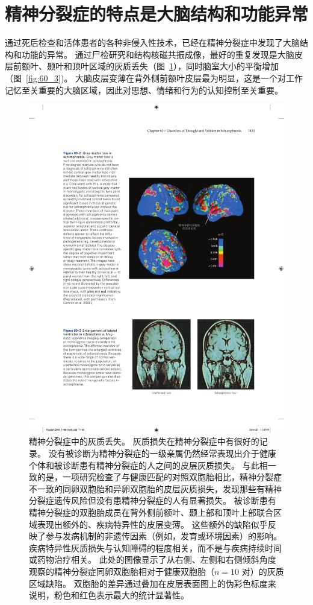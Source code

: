 \section{精神分裂症的特点是大脑结构和功能异常}

通过死后检查和活体患者的各种非侵入性技术，已经在精神分裂症中发现了大脑结构和功能的异常。
通过尸检研究和结构核磁共振成像，最好的重复发现是大脑皮层前额叶、颞叶和顶叶区域的灰质丢失（图~\ref{fig:60_2}），同时脑室大小的平衡增加（图~\ref{fig:60_3})。
大脑皮层变薄在背外侧前额叶皮层最为明显，这是一个对工作记忆至关重要的大脑区域，因此对思想、情绪和行为的认知控制至关重要。



\begin{figure}[htbp]
	\centering
	\includegraphics[width=0.83\linewidth]{chap60/fig_60_2}
	\caption{精神分裂症中的灰质丢失。
		灰质损失在精神分裂症中有很好的记录。
		没有被诊断为精神分裂症的一级亲属仍然经常表现出介于健康个体和被诊断患有精神分裂症的人之间的皮层灰质损失。
		与此相一致的是，一项研究检查了与健康匹配的对照双胞胎相比，精神分裂症不一致的同卵双胞胎和异卵双胞胎的皮层灰质损失，发现那些有精神分裂症遗传风险但没有患精神分裂症的人有显著损失。
		被诊断患有精神分裂症的双胞胎成员在背外侧前额叶、颞上部和顶叶上部联合区域表现出额外的、疾病特异性的皮层变薄。
		这些额外的缺陷似乎反映了参与发病机制的非遗传因素（例如，发育或环境因素）的影响。
		疾病特异性灰质损失与认知障碍的程度相关，而不是与疾病持续时间或药物治疗相关。
		此处的图像显示了从右侧、左侧和右侧倾斜角度观察的精神分裂症同卵双胞胎相对于健康双胞胎（$ n = 10 $ 对）的灰质区域缺陷。
		双胞胎的差异通过叠加在皮层表面图上的伪彩色标度来说明，粉色和红色表示最大的统计显著性\cite{cannon2002cortex}。}
	\label{fig:60_2}
\end{figure}


